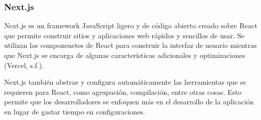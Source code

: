 \subsubsection{Next.js}
Next.js es un framework JavaScript ligero y de código abierto creado sobre React que permite construir sitios y aplicaciones web rápidos y sencillos de usar. Se utilizan los componenetes de React para construir la interfaz de usuario mientras que Next.js se encarga de algunas características adicionales y optimizaciones (Vercel, s.f.).

Next.js también abstrae y configura automáticamente las herramientas que se requieren para React, como agrupación, compilación, entre otras cosas. Esto permite que los desarrolladores se enfoquen más en el desarrollo de la aplicación en lugar de gastar tiempo en configuraciones.